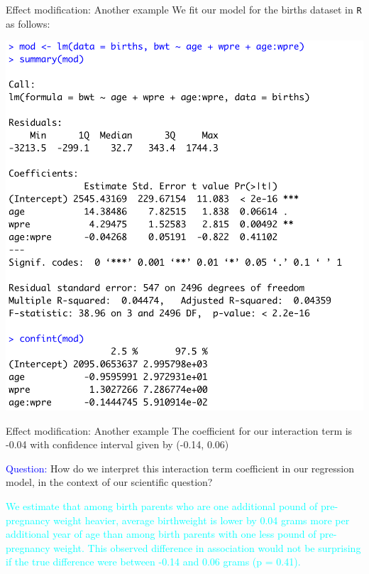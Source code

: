\documentclass[10pt,t]{beamer}
\begin{document}
\begin{frame}{Effect modification: Another example}
We fit our model for the births dataset in \texttt{R} as follows:

\vspace{0.3cm}

\centering \includegraphics[scale=0.37]{effectmod2.png}
\end{frame}

\begin{frame}{Effect modification: Another example}
The coefficient for our interaction term is -0.04 with confidence interval given by (-0.14, 0.06)

\vspace{0.3cm}

\textcolor{blue}{Question:} How do we interpret this interaction term coefficient in our regression model, in the context of our scientific question? \pause

\vspace{0.3cm}

\textcolor{cyan}{We estimate that among birth parents who are one additional pound of pre-pregnancy weight heavier, average birthweight is lower by 0.04 grams more per additional year of age than among birth parents with one less pound of pre-pregnancy weight. This observed difference in association would not be surprising if the true difference were between -0.14 and 0.06 grams (p = 0.41).}

\end{frame}
\end{document}
